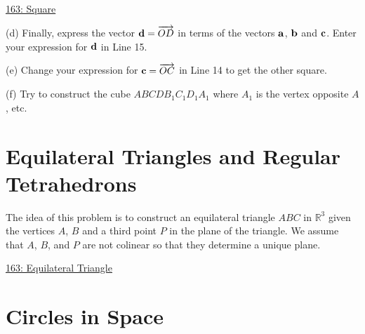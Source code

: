 \documentclass{ximera}
\begin{document}
\begin{question}
\href{https://www.desmos.com/3d/uule7dqdl4}{163: Square}

(d) Finally, express the vector ${\bf d} = \overrightarrow{OD}$ in terms of the vectors ${\bf a}$, ${\bf b}$ and ${\bf c}$. Enter your expression for ${\bf d}$ in Line 15. 

(e) Change your expression for ${\bf c} = \overrightarrow{OC}$ in Line 14 to get the other square.

(f) Try to construct the cube $ABCDB_1C_1D_1A_1$ where $A_1$ is the vertex opposite $A$, etc. 

\end{question}

\section{Equilateral Triangles and Regular Tetrahedrons}





\begin{question}  \label{Qdfdsffrr3tg}
The idea of this problem is to construct an equilateral triangle $ABC$ in $\mathbb{R}^3$ given the vertices $A$, $B$ and a third point $P$ in the plane of the triangle. We assume that $A$, $B$, and $P$ are not colinear so that they determine a unique plane.

\begin{onlineOnly}
    \begin{center}
\end{center}
\end{onlineOnly}

\href{https://www.desmos.com/3d/3fktg1c31g}{163: Equilateral Triangle}

\end{question}


\section{Circles in Space}
\end{document}
